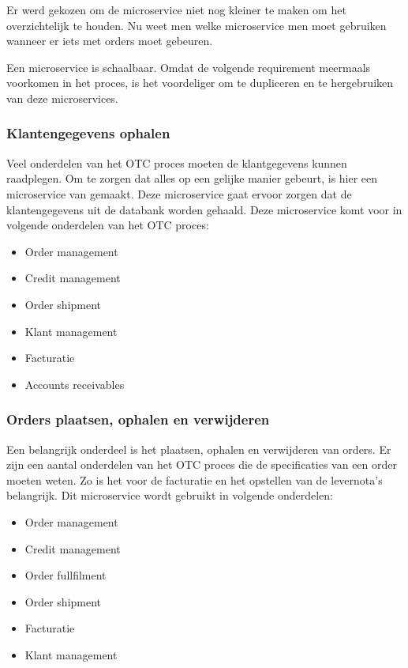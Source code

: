 Er werd gekozen om de microservice niet nog kleiner te maken om het overzichtelijk te houden. Nu weet men welke microservice men moet gebruiken wanneer er iets met orders moet gebeuren.   

Een microservice is schaalbaar. Omdat de volgende requirement meermaals voorkomen in het proces, is het voordeliger om te dupliceren en te hergebruiken van deze microservices.


\subsubsection{Klantengegevens ophalen}
Veel onderdelen van het OTC proces moeten de klantgegevens kunnen raadplegen. Om te zorgen dat alles op een gelijke manier gebeurt, is hier een microservice van gemaakt.
Deze microservice gaat ervoor zorgen dat de klantengegevens uit de databank worden gehaald.
Deze microservice komt voor in volgende onderdelen van het OTC proces:
\begin{itemize}
	\item Order management
	\item Credit management
	\item Order shipment
	\item Klant management
	\item Facturatie
	\item Accounts receivables
\end{itemize}

\subsubsection{Orders plaatsen, ophalen en verwijderen}
Een belangrijk onderdeel is het plaatsen, ophalen en verwijderen van orders. Er zijn een aantal onderdelen van het OTC proces die de specificaties van een order moeten weten. Zo is het voor de facturatie en het opstellen van de levernota's belangrijk.
Dit microservice wordt gebruikt in volgende onderdelen:
\begin{itemize}
	\item Order management
	\item Credit management
	\item Order fullfilment
	\item Order shipment
	\item Facturatie
	\item Klant management
\end{itemize}

